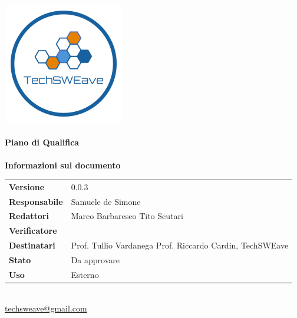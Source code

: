 \documentclass[a4paper]{article}
\begin{document}
\begin{titlepage}
    \begin{center}
        \includegraphics{../../../Images/logo}\\
        \vspace{20px}
        \textcolor{logo}{\hrulefill}\\
        \vspace{20px}
        \textbf{\huge\textcolor{logo}{Piano di Qualifica}}\\
        \vspace{10px}
        \textcolor{logo}{\hrulefill}\\
        \vspace{40px}
        \textbf{\Large Informazioni sul documento}\\
        \vspace{20px}
        \begin{tabular}{p{100px} | p{100px}}
            \textbf{Versione} & 0.0.3\\
            \textbf{Responsabile} & Samuele de Simone\\
            \textbf{Redattori} & Marco Barbaresco \newline Tito Scutari\\
            \textbf{Verificatore} & \\
            \textbf{Destinatari} & Prof. Tullio Vardanega \newline Prof. Riccardo Cardin, \newline TechSWEave\\
            \textbf{Stato} & Da approvare\\
            \textbf{Uso} & Esterno\\
        \end{tabular}\\
        \vspace{60px}
        \href{mailto:techsweave@gmail.com}{techsweave@gmail.com}\\

    \end{center}
    \end{titlepage}
\end{document}
